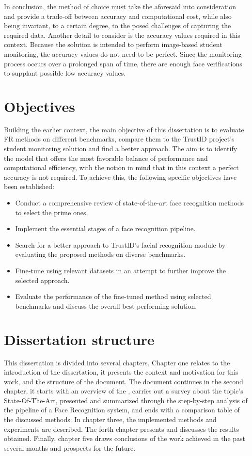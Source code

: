 \documentclass[class=report, crop=false, a4paper, 12pt]{standalone}
\begin{document}
\par In conclusion, the method of choice must take the aforesaid into consideration and provide a trade-off between accuracy and computational cost, while also being invariant, to a certain degree, to the posed challenges of capturing the required data. Another detail to consider is the accuracy values required in this context. Because the solution is intended to perform image-based student monitoring, the accuracy values do not need to be perfect. Since the monitoring process occurs over a prolonged span of time, there are enough face verifications to supplant possible low accuracy values.

\section{Objectives}
Building  the earlier context, the main objective of this dissertation is to evaluate \gls{FR} methods on different benchmarks, compare them to the TrustID project's student monitoring solution and find a better approach. The aim is to identify the model that offers the most favorable balance of performance and computational efficiency, with the notion in mind that in this context a perfect accuracy is not required. To achieve this, the following specific objectives have been established:
\begin{itemize}
    \item Conduct a comprehensive review of state-of-the-art face recognition methods to select the prime ones.
    \item Implement the essential stages of a face recognition pipeline.
    \item Search for a better approach to TrustID's facial recognition module by evaluating the proposed methods on diverse benchmarks.
    \item Fine-tune using relevant datasets in an attempt to further improve the selected approach.
    \item Evaluate the performance of the fine-tuned method using selected benchmarks and discuss the overall best performing solution.
\end{itemize}

\section{Dissertation structure}
\par This dissertation is divided into several chapters. Chapter one relates to the introduction of the dissertation, it presents the context and motivation for this work, and the structure of the document. The document continues in the second chapter, it starts with an overview of the , carries out a survey about the topic's State-Of-The-Art, presented and summarized through the step-by-step analysis of the pipeline of a Face Recognition system, and ends with a comparison table of the discussed methods. In chapter three, the implemented methods and experiments are described. The forth chapter presents and discusses the results obtained. Finally, chapter five draws conclusions of the work achieved in the past several months and prospects for the future.
\end{document}
